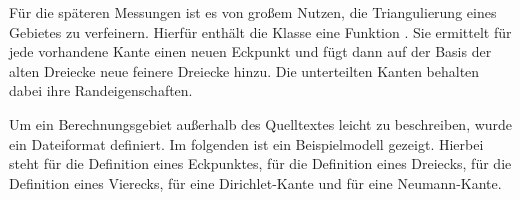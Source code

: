 \documentclass[crop=false,10pt,ngerman]{standalone}
\begin{document}
      Für die späteren Messungen ist es von großem Nutzen, die Triangulierung eines Gebietes zu verfeinern.
      Hierfür enthält die Klasse  eine Funktion .
      Sie ermittelt für jede vorhandene Kante einen neuen Eckpunkt und fügt dann auf der Basis der alten Dreiecke neue feinere Dreiecke hinzu.
      Die unterteilten Kanten behalten dabei ihre Randeigenschaften.

      Um ein Berechnungsgebiet außerhalb des Quelltextes leicht zu beschreiben, wurde ein Dateiformat definiert.
      Im folgenden ist ein Beispielmodell gezeigt.
      Hierbei steht  für die Definition eines Eckpunktes,  für die Definition eines Dreiecks,  für die Definition eines Vierecks,  für eine Dirichlet-Kante und  für eine Neumann-Kante.
      \begin{center}
        \noindent
        \begin{minipage}[b]{0.32\textwidth}
          \begin{tcolorbox}[titlerule=0.1pt,boxrule=0.5pt,arc=5pt,title={Zeile 1-13}]
            
          \end{tcolorbox}
        \end{minipage}
        \hfill
        \begin{minipage}[b]{0.32\textwidth}
          \begin{tcolorbox}[titlerule=0.1pt,boxrule=0.5pt,arc=5pt,title={Zeile 14-26}]
            
          \end{tcolorbox}
        \end{minipage}
        \hfill
        \begin{minipage}[b]{0.32\textwidth}
          \begin{tcolorbox}[titlerule=0.1pt,boxrule=0.5pt,arc=5pt,title={Zeile 27-39}]
            
          \end{tcolorbox}
        \end{minipage}
      \end{center}
\end{document}
